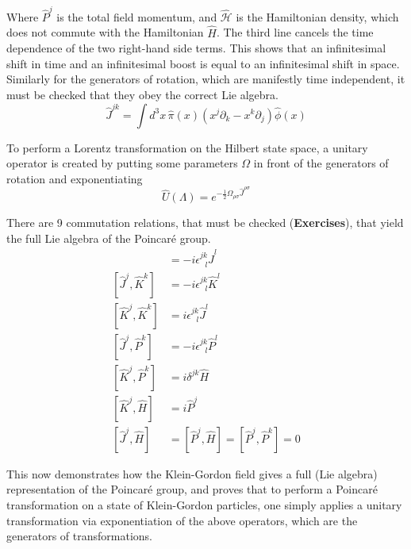 \noindent Where $\hat{P}^j$ is the total field momentum, and $\hat{\mathscr{H}}$ is the Hamiltonian density, which does not commute with the Hamiltonian $\hat{H}$. The third line cancels the time dependence of the two right-hand side terms. This shows that an infinitesimal shift in time and an infinitesimal boost is equal to an infinitesimal shift in space. \\

\noindent Similarly for the generators of rotation, which are manifestly time independent, it must be checked that they obey the correct Lie algebra. 
\begin{equation}
\hat{J}^{jk} = \int d^3 x \, \hat{\pi}(x)(x^j \partial_k - x^k \partial_j) \hat{\phi}(x)
\end{equation}

\noindent To perform a Lorentz transformation on the Hilbert state space, a unitary operator is created by putting some parameters $\Omega$ in front of the generators of rotation and exponentiating
\begin{equation}
\hat{U}(\Lambda) = e^{-\frac{1}{2} \Omega_{\rho\sigma} \hat{J}^{\rho\sigma}}
\end{equation}

\noindent There are 9 commutation relations, that must be checked (\textbf{Exercises}), that yield the full Lie algebra of the Poincar\'e group.
\begin{align}
[\hat{J}^j, \hat{J}^k] &= -i \epsilon^{jk}_{\,\,\,\,l} \hat{J}^l \\
[\hat{J}^j, \hat{K}^k] &= -i \epsilon^{jk}_{\,\,\,\,l} \hat{K}^l \\
[\hat{K}^j, \hat{K}^k] &= i \epsilon^{jk}_{\,\,\,\,l} \hat{J}^l \\
[\hat{J}^j, \hat{P}^k] &= -i \epsilon^{jk}_{\,\,\,\,l} \hat{P}^l \\
[\hat{K}^j, \hat{P}^k] &= i \delta^{jk} \hat{H} \\
[\hat{K}^j, \hat{H}] &= i \hat{P}^j \\
[\hat{J}^j, \hat{H}] &=  [\hat{P}^j, \hat{H}] = [\hat{P}^j, \hat{P}^k] = 0
\end{align}

\noindent This now demonstrates how the Klein-Gordon field gives a full (Lie algebra) representation of the Poincar\'e group, and  proves that to perform a Poincar\'e transformation on a state of Klein-Gordon particles, one simply applies a unitary transformation via exponentiation of the above operators, which are the generators of transformations.